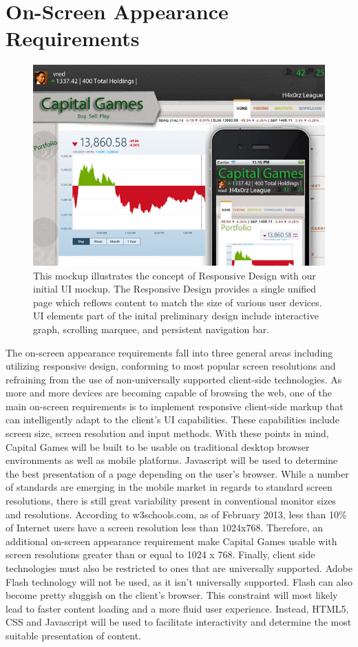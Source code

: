 \section{On-Screen Appearance Requirements}
{
\begin{figure}
\centering
\includegraphics[width=5.5in]{./img/responsiveenough.jpg}
\caption{This mockup illustrates the concept of Responsive Design
with our initial UI mockup. The Responsive Design provides a single
unified page which reflows content to match the size of various
user devices. \cite{wiki:responsive} UI elements part of the inital 
preliminary design include interactive graph, scrolling marquee, 
and persistent navigation bar.}
\end{figure}
}
The on-screen appearance requirements fall into three general areas including utilizing responsive design, conforming to most popular screen resolutions and refraining from the use of non-universally supported client-side technologies. As more and more devices are becoming capable of browsing the web, one of the main on-screen requirements is to implement responsive client-side markup that can intelligently adapt to the client’s UI capabilities. These capabilities include screen size, screen resolution and input methods. With these points in mind, Capital Games will be built to be usable on traditional desktop browser environments as well as mobile platforms. Javascript will be used to determine the best presentation of a page depending on the user’s browser. While a number of standards are emerging in the mobile market in regards to standard screen resolutions, there is still great variability present in conventional monitor sizes and resolutions. According to w3schools.com, as of February 2013, less than 10\% of Internet users have a screen resolution less than 1024x768. Therefore, an additional on-screen appearance requirement make Capital Games usable with screen resolutions greater than or equal to 1024 x 768. Finally, client side technologies must also be restricted to ones that are universally supported. Adobe Flash technology will not be used, as it isn’t universally supported. Flash can also become pretty sluggish on the client’s browser. This constraint will most likely lead to faster content loading and a more fluid user experience. Instead, HTML5, CSS and Javascript will be used to facilitate interactivity and determine the most suitable presentation of content.